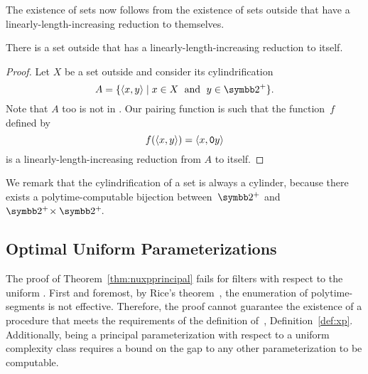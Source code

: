 The existence of  sets now follows from the existence of sets outside  that have a linearly-length-increasing reduction to themselves.
\begin{lemma}
  There is a set outside  that has a linearly-length-increasing reduction to itself.
\end{lemma}
\begin{proof}
  Let $X$ be a set outside  and consider its cylindrification \parencite[see][Section~5.3]{balcazar1990structural}
  \begin{equation*}
    A \deq \{\pair{x}{y} \st x \in X \reland y \in \binary^+\}.
  \end{equation*}
  Note that $A$ too is not in .
  Our pairing function is such that the function~$f$ defined by
  \begin{equation*}
    f({\langle x, y\rangle}) = {\langle x, \textnormal{\texttt{0}}y\rangle}
  \end{equation*}
  is a linearly-length-increasing reduction from $A$ to itself.
\end{proof}

We remark that the cylindrification of a set is always a \pdash{}cylinder, because there exists a polytime-computable bijection between~$\binary^+$ and~$\binary^+\! \times \binary^+\!$.

\subsection{Optimal Uniform Parameterizations}
\label{sec:tractability:optimal}%
The proof of Theorem~\ref{thm:nuxpprincipal} fails for filters with respect to the uniform .
First and foremost, by Rice's theorem~\parencite{rice1953classes}, the enumeration of polytime-segments is not effective.
Therefore, the proof cannot guarantee the existence of a procedure that meets the requirements of the definition of~, Definition~\ref{def:xp}.
Additionally, being a principal parameterization with respect to a uniform complexity class requires a bound on the gap to any other parameterization to be computable.

